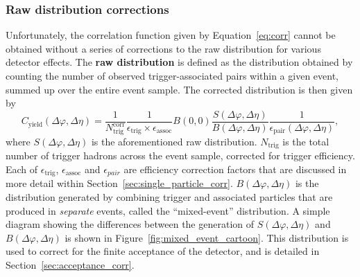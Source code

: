 \subsubsection{Raw distribution corrections}
Unfortunately, the correlation function given by Equation~\ref{eq:corr} cannot be obtained without a series of corrections to the raw distribution for various detector effects. The \textbf{raw distribution} is defined as the distribution obtained by counting the number of observed trigger-associated pairs within a given event, summed up over the entire event sample. The corrected distribution is then given by
%
\begin{equation}
    C_{\text{yield}}(\Delta\varphi, \Delta\eta) = \frac{1}{N_{\text{trig}}^{\text{corr}}}\frac{1}{\epsilon_{\text{trig}}\times\epsilon_{\text{assoc}}}B(0,0)\frac{S(\Delta\varphi, \Delta\eta)}{B(\Delta\varphi, \Delta\eta)}\frac{1}{\epsilon_{\text{pair}}(\Delta\varphi, \Delta\eta)},
\label{eq:corr_detector}
\end{equation}
%
where $S(\Delta\varphi, \Delta\eta)$ is the aforementioned raw distribution. $N_{\text{trig}}$ is the total number of trigger hadrons across the event sample, corrected for trigger efficiency. Each of $\epsilon_{\text{trig}}$, $\epsilon_{\text{assoc}}$ and $\epsilon_{pair}$ are efficiency correction factors that are discussed in more detail within Section~\ref{sec:single_particle_corr}.  $B(\Delta\varphi, \Delta\eta)$ is the distribution generated by combining trigger and associated particles that are produced in \textit{separate} events, called the ``mixed-event'' distribution. A simple diagram showing the differences between the generation of $S(\Delta\varphi, \Delta\eta)$ and $B(\Delta\varphi, \Delta\eta)$ is shown in Figure~\ref{fig:mixed_event_cartoon}. This distribution is used to correct for the finite acceptance of the detector, and is detailed in Section~\ref{sec:acceptance_corr}.

